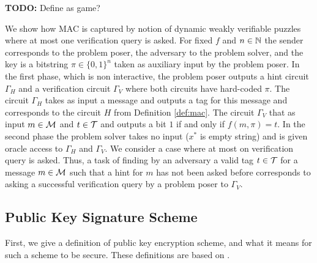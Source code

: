 \begin{todo}
  \textbf{TODO:} Define as game?
\end{todo}

We show how MAC is captured by notion of dynamic weakly verifiable puzzles where at most one verification query is asked.
For fixed $f$ and $n \in \mathbb{N}$ the sender corresponds to the problem poser, the adversary to the problem solver,
and the key is a bitstring $\pi \in \{0,1\}^{n}$ taken as auxiliary input by the problem poser.
In the first phase, which is non interactive, the problem poser outputs a hint circuit
$\Gamma_H$ and a verification circuit $\Gamma_V$ where both circuits have hard-coded $\pi$.
The circuit $\Gamma_H$ takes as input a message and outputs a tag for this message and corresponds to the circuit $H$ from Definition \ref{def:mac}.
The circuit $\Gamma_V$ that as input $m \in \mathcal{M}$ and $t \in \mathcal{T}$ and outputs a bit $1$ if and only if $f(m, \pi) = t$.
In the second phase the problem solver takes no input ($x^*$ is empty string) and is given oracle access to $\Gamma_H$ and $\Gamma_V$.
We consider a case where at most on verification query is asked.
Thus, a task of finding by an adversary a valid tag $t \in \mathcal{T}$ for a message $m \in \mathcal{M}$ such that a hint for $m$ has not been asked before
corresponds to asking a successful verification query by a problem poser to $\Gamma_V$.
%
\subsection{Public Key Signature Scheme}
First, we give a definition of public key encryption scheme, and what it means for such a scheme to be secure.
These definitions are based on \cite{Goldreich:2004:FCV:975541}.

